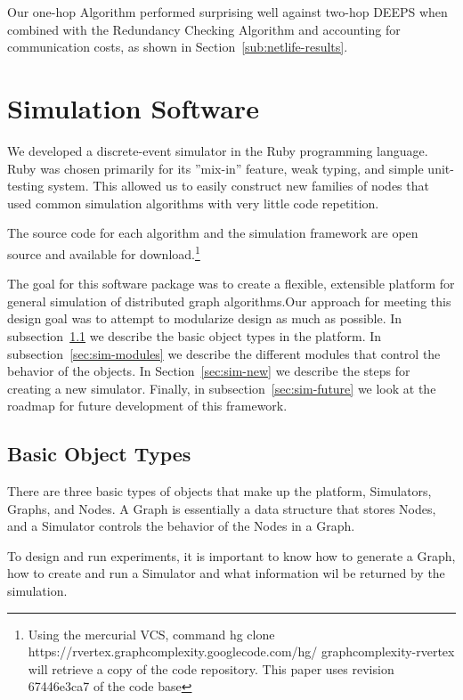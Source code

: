Our one-hop Algorithm performed surprising well against two-hop DEEPS when combined with the Redundancy Checking Algorithm and accounting for communication costs, as shown in Section~\ref{sub:netlife-results}.




\section{Simulation Software}
\label{sec:simulator}

We developed a discrete-event simulator in the Ruby programming language. Ruby was chosen primarily for its ''mix-in'' feature, weak typing, and simple unit-testing system. This allowed us to easily construct new families of nodes that used common simulation algorithms with very little code repetition.

The source code for each algorithm and the simulation framework are open source and available for download.\footnote{Using the mercurial VCS, command hg clone https://rvertex.graphcomplexity.googlecode.com/hg/ graphcomplexity-rvertex will retrieve a copy of the code repository. This paper uses revision 67446e3ca7 of the code base} 

The goal for this software package was to create a flexible, extensible platform for general simulation of distributed graph algorithms.Our approach for meeting this design goal was to attempt to modularize design as much as possible. In subsection~\ref{sec:sim-objects} we describe the basic object types in the platform. In subsection~\ref{sec:sim-modules} we describe the different modules that control the behavior of the objects. In Section~\ref{sec:sim-new} we describe the steps for creating a new simulator. Finally, in subsection~\ref{sec:sim-future} we look at the roadmap for future development of this framework.

\subsection{Basic Object Types}
\label{sec:sim-objects}

There are three basic types of objects that make up the platform, Simulators, Graphs, and Nodes. A Graph is essentially a data structure that stores Nodes, and a Simulator controls the behavior of the Nodes in a Graph. 

To design and run experiments, it is important to know how to generate a Graph, how to create and run a Simulator and what information wil be returned by the simulation. 

